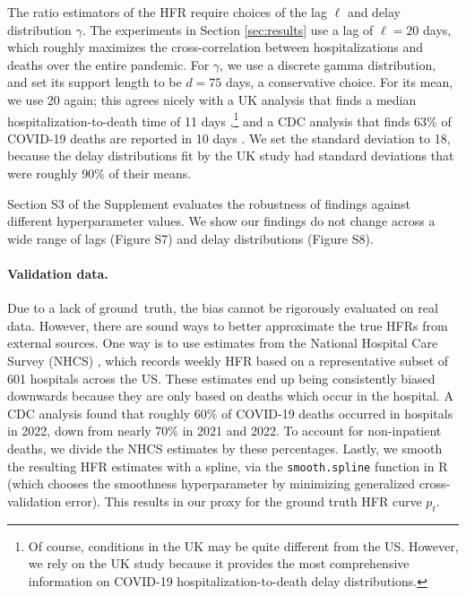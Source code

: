 \documentclass{article}
\begin{document}
The ratio estimators of the HFR require choices of the lag $\ell$ and delay
distribution $\gamma$. The experiments in Section \ref{sec:results} use a lag of
$\ell=20$ days, which roughly maximizes the cross-correlation between
hospitalizations and deaths over the entire pandemic. For $\gamma$, we use a
discrete gamma distribution, and set its support length to be $d=75$ days, a
conservative choice. For its mean, we use 20 again; this agrees nicely with a UK
analysis that finds a median hospitalization-to-death time of 11 days
\citep{UKdelay},\footnote{Of course, conditions in the UK may be quite different
  from the US. However, we rely on the UK study because it provides the most
  comprehensive information on COVID-19 hospitalization-to-death delay 
  distributions.}   
and a CDC analysis that finds 63\% of COVID-19 deaths are reported in 10 days   
\citep{cdc_deaths_demographic_geographic_2023}. We set the standard deviation to 
18, because the delay distributions fit by the UK study had standard deviations
that were roughly 90\% of their means. 

Section S3 of the Supplement evaluates
the robustness of findings against different hyperparameter values. 
We show our findings do not change across a wide range of lags (Figure S7) and delay distributions (Figure S8).

\paragraph{Validation data.}

Due to a lack of ground truth, the bias cannot be rigorously evaluated on real data. 
However, there are sound ways to better approximate the true HFRs from external sources.
One way is to use estimates from the National Hospital Care Survey (NHCS)
\citep{NHCS2023}, which records weekly HFR based on a representative subset 
of 601 hospitals across the US. These estimates end up being consistently
biased downwards because they are only based on deaths which occur in the
hospital. A CDC analysis \citep{ahmad2023covid} found that roughly 60\% of
COVID-19 deaths occurred in hospitals in 2022, down from nearly 70\% in 2021 and
2022. To account for non-inpatient deaths, we divide the NHCS estimates by these
percentages. Lastly, we smooth the resulting HFR estimates with a spline, via
the \texttt{smooth.spline} function in R (which chooses the smoothness
hyperparameter by minimizing generalized cross-validation error). This results 
in our proxy for the ground truth HFR curve $p_t$.  
\end{document}
